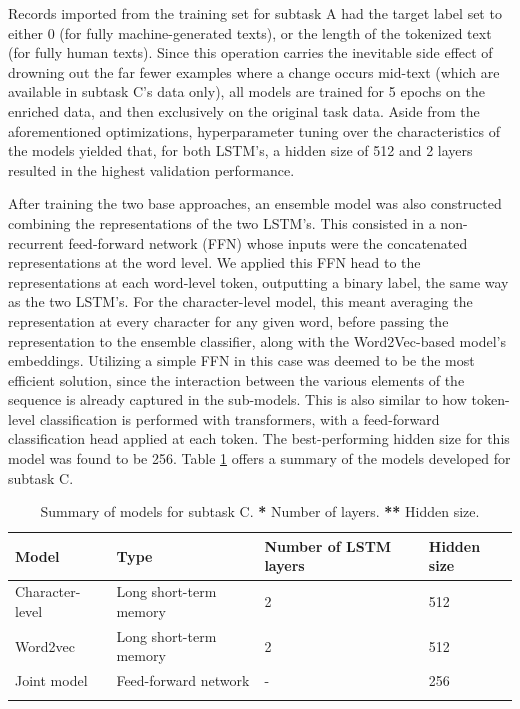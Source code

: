 Records imported from the training set for subtask A had the target label set to either 0 (for fully machine-generated texts), or the length of the tokenized text (for fully human texts).
Since this operation carries the inevitable side effect of drowning out the far fewer examples where a change occurs mid-text (which are available in subtask C's data only), all models are trained for 5 epochs on the enriched data, and then exclusively on the original task data.
Aside from the aforementioned optimizations, hyperparameter tuning over the characteristics of the models yielded that, for both LSTM's, a hidden size of 512 and 2 layers resulted in the highest validation performance.

After training the two base approaches, an ensemble model was also constructed combining the representations of the two LSTM's.
This consisted in a non-recurrent feed-forward network (FFN) whose inputs were the concatenated representations at the word level.
We applied this FFN head to the representations at each word-level token, outputting a binary label, the same way as the two LSTM's.
For the character-level model, this meant averaging the representation at every character for any given word, before passing the representation to the ensemble classifier, along with the Word2Vec-based model's embeddings.
Utilizing a simple FFN in this case was deemed to be the most efficient solution, since the interaction between the various elements of the sequence is already captured in the sub-models.
This is also similar to how token-level classification is performed with transformers, with a feed-forward classification head applied at each token.
The best-performing hidden size for this model was found to be 256.
Table \ref{tab:c_models} offers a summary of the models developed for subtask C.

\begin{table}[h]
    \centering
    \begin{tabular}{llll}
        \hline
        \textbf{Model}  & \textbf{Type}          & \textbf{Number of LSTM layers} & \textbf{Hidden size} \\
        \hline
        Character-level & Long short-term memory & 2                              & 512                  \\
        Word2vec        & Long short-term memory & 2                              & 512                  \\
        Joint model     & Feed-forward network   & -                              & 256                  \\
        \hline
        \vspace{0.1cm}
    \end{tabular}
    \caption{Summary of models for subtask C. \textbf{*} Number of layers. \textbf{**} Hidden size.}
    \label{tab:c_models}
\end{table}


